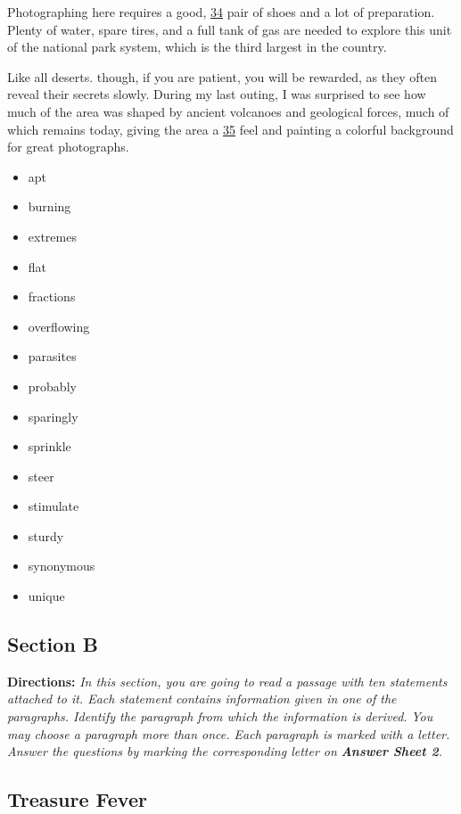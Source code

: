 \documentclass[UTF8,11pt]{ctexart}
\begin{document}
Photographing here requires a good, \uline{34} pair of shoes and a lot of preparation. Plenty of water, spare tires, and a full tank of gas are needed to explore this unit of the national park system, which is the third largest in the country.


Like all deserts. though, if you are patient, you will be rewarded, as they often reveal their secrets slowly. During my last outing, I was surprised to see how much of the area was shaped by ancient volcanoes and geological forces, much of which remains today, giving the area a \uline{35} feel and painting a colorful background for great photographs.


\begin{itemize}[leftmargin=2em,itemsep=.2em,topsep=.4em]\item[A.] apt
\item[B.] burning
\item[C.] extremes
\item[D.] flat
\item[E.] fractions
\item[F.] overflowing
\item[G.] parasites
\item[H.] probably
\item[I.] sparingly
\item[J.] sprinkle
\item[K.] steer
\item[L.] stimulate
\item[M.] sturdy
\item[N.] synonymous
\item[O.] unique
\end{itemize}

\subsection*{\textbf{Section B}}


\textbf{Directions:} \textit{In this section, you are going to read a passage with ten statements attached to it. Each statement} \textit{contains information given in one of the paragraphs. Identify the paragraph from which the information is derived.} \textit{You may choose a paragraph more than once. Each paragraph is marked with a letter. Answer the questions by} \textit{marking the corresponding letter on }\textbf{\textit{Answer Sheet 2}}\textit{.}


\subsection*{\textbf{Treasure Fever}}
\end{document}
